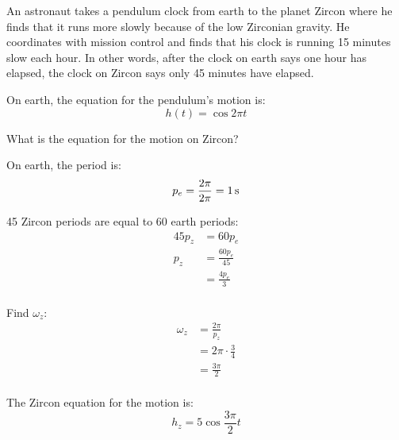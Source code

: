 \documentclass[fleqn,addpoints]{exam}
\begin{document}
\begin{questions}
\begin{solution}
      \end{solution}


    \bonusquestion
      An astronaut takes a pendulum clock from earth to the planet Zircon where he finds that it runs more slowly
      because of the low Zirconian gravity.      He coordinates with mission control and finds that his clock is running
      15 minutes slow each hour.  In other words, after the clock on earth says one hour has elapsed, the clock on
      Zircon says only 45 minutes have elapsed.

      On earth, the equation for the pendulum's motion is:
      \[
        h(t) = \cos 2 \pi t
      \]

      \begin{parts}
          
        \bonuspart[8]
          What is the equation for the motion on Zircon?

          \begin{solution}
            On earth, the period is:
            \[
              p_e = \frac{2 \pi}{2 \pi} = \unit[1]{s}
            \]

            45 Zircon periods are equal to 60 earth periods:
            \begin{align*}
              45 p_z & = 60 p_e \\
              p_z    & = \frac{ 60 p_e }{45} \\
                     & = \frac{ 4 p_e }{3} \\
            \end{align*}

            Find $\omega_z$:
            \begin{align*}
              \omega_z & = \frac{2 \pi}{p_z} \\
                       & = 2 \pi \cdot \frac{3}{4} \\
                       & = \frac{3 \pi}{2} \\
            \end{align*}

            The Zircon equation for the motion is:
            \[
              h_z = 5 \cos \frac{3 \pi}{2} t
            \]

          \end{solution}


\end{parts}
\end{questions}
\end{document}
